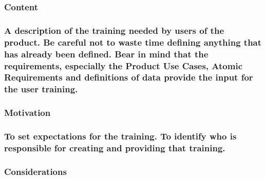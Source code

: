 \documentclass[
]{article}
\begin{document}
\hypertarget{content-75}{%
\subsubsection{Content}\label{content-75}}

\hypertarget{a-description-of-the-training-needed-by-users-of-the-product.-be-careful-not-to-waste-time-defining-anything-that-has-already-been-defined.-bear-in-mind-that-the-requirements-especially-the-product-use-cases-atomic-requirements-and-definitions-of-data-provide-the-input-for-the-user-training.}{%
\subsubsection{\texorpdfstring{A description of the training needed by
users of the product. Be careful not to waste time defining anything
that has already been defined. Bear in mind that the requirements,
especially the Product Use Cases, Atomic Requirements and definitions of
data provide the input for the user training.
}{A description of the training needed by users of the product. Be careful not to waste time defining anything that has already been defined. Bear in mind that the requirements, especially the Product Use Cases, Atomic Requirements and definitions of data provide the input for the user training. }}\label{a-description-of-the-training-needed-by-users-of-the-product.-be-careful-not-to-waste-time-defining-anything-that-has-already-been-defined.-bear-in-mind-that-the-requirements-especially-the-product-use-cases-atomic-requirements-and-definitions-of-data-provide-the-input-for-the-user-training.}}

\hypertarget{motivation-74}{%
\subsubsection{Motivation}\label{motivation-74}}

\hypertarget{to-set-expectations-for-the-training.-to-identify-who-is-responsible-for-creating-and-providing-that-training.}{%
\subsubsection{To set expectations for the training. To identify who is
responsible for creating and providing that
training.}\label{to-set-expectations-for-the-training.-to-identify-who-is-responsible-for-creating-and-providing-that-training.}}

\hypertarget{considerations-56}{%
\subsubsection{Considerations}\label{considerations-56}}
\end{document}
